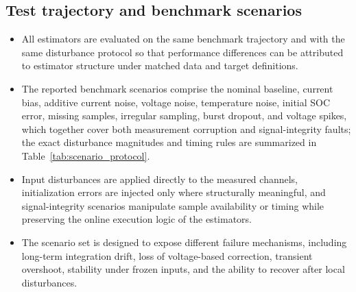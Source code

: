 \documentclass[review,nopreprintline]{elsarticle}
\begin{document}
\subsection{Test trajectory and benchmark scenarios}
\begin{itemize}[leftmargin=*]
    \item All estimators are evaluated on the same benchmark trajectory and with the same disturbance protocol so that performance differences can be attributed to estimator structure under matched data and target definitions.
    \item The reported benchmark scenarios comprise the nominal baseline, current bias, additive current noise, voltage noise, temperature noise, initial SOC error, missing samples, irregular sampling, burst dropout, and voltage spikes, which together cover both measurement corruption and signal-integrity faults; the exact disturbance magnitudes and timing rules are summarized in Table~\ref{tab:scenario_protocol}.
    \item Input disturbances are applied directly to the measured channels, initialization errors are injected only where structurally meaningful, and signal-integrity scenarios manipulate sample availability or timing while preserving the online execution logic of the estimators.
    \item The scenario set is designed to expose different failure mechanisms, including long-term integration drift, loss of voltage-based correction, transient overshoot, stability under frozen inputs, and the ability to recover after local disturbances.
\end{itemize}
\end{document}
